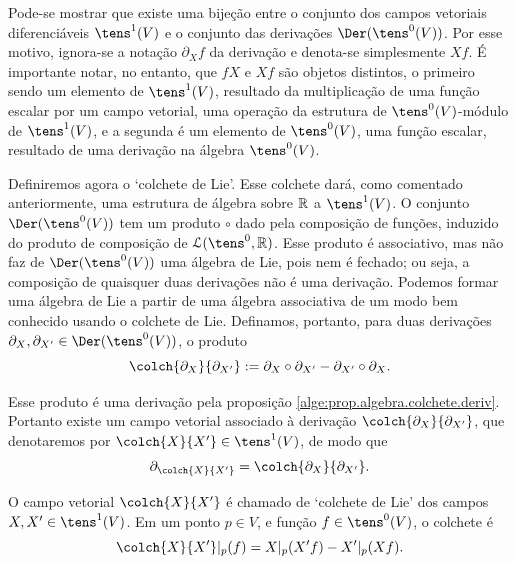 Pode-se mostrar que existe uma bijeção entre o conjunto dos campos vetoriais diferenciáveis $\tens^1(V)$ e o conjunto das derivações $\Der(\tens^0(V))$. Por esse motivo, ignora-se a notação $\partial_X f$ da derivação e denota-se simplesmente $Xf$. É importante notar, no entanto, que $fX$ e $Xf$ são objetos distintos, o primeiro sendo um elemento de $\tens^1(V)$, resultado da multiplicação de uma função escalar por um campo vetorial, uma operação da estrutura de $\tens^0(V)$-módulo de $\tens^1(V)$, e a segunda é um elemento de $\tens^0(V)$, uma função escalar, resultado de uma derivação na álgebra $\tens^0(V)$.

Definiremos agora o `colchete de Lie'. Esse colchete dará, como comentado anteriormente, uma estrutura de álgebra sobre $\mathbb{R}$ a $\tens^1(V)$. O conjunto $\Der(\tens^0(V))$ tem um produto $\circ$ dado pela composição de funções, induzido do produto de composição de $\lin(\tens^0,\R)$. Esse produto é associativo, mas não faz de $\Der(\tens^0(V))$ uma álgebra de Lie, pois nem é fechado; ou seja, a composição de quaisquer duas derivações não é uma derivação. Podemos formar uma álgebra de Lie a partir de uma álgebra associativa de um modo bem conhecido usando o colchete de Lie. Definamos, portanto, para duas derivações $\partial_X,\partial_{X'} \in \Der(\tens^0(V))$, o produto
	\begin{equation*}
	\colch{\partial_X}{\partial_{X'}} := \partial_X \circ \partial_{X'} - \partial_{X'} \circ \partial_X.
	\end{equation*}

Esse produto é uma derivação pela proposição \ref{alge:prop.algebra.colchete.deriv}. Portanto existe um campo vetorial associado à derivação $\colch{\partial_X}{\partial_{X'}}$, que denotaremos por $\colch{X}{X'} \in \tens^1(V)$, de modo que
	\begin{equation*}
	\partial_{\colch{X}{X'}} = \colch{\partial_X}{\partial_{X'}}.
	\end{equation*}

O campo vetorial $\colch{X}{X'}$ é chamado de `colchete de Lie' dos campos $X,X' \in \tens^1(V)$. Em um ponto $p \in V$, e função $f \in \tens^0(V)$, o colchete é
	\begin{equation*}
	\colch{X}{X'}|_p(f) = X|_p(X' f) - X'|_p(X f).
	\end{equation*}


